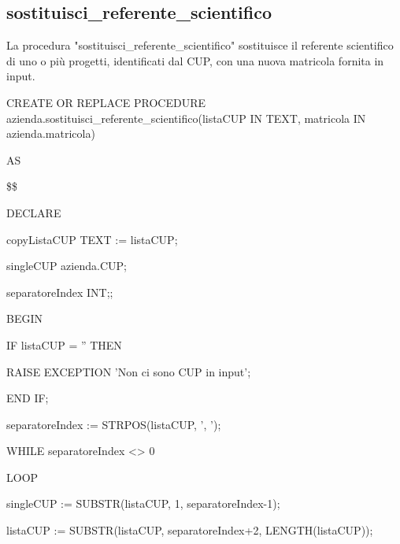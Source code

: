         \subsection{sostituisci\_referente\_scientifico}
        La procedura "sostituisci\_referente\_scientifico" sostituisce il referente scientifico di uno o più progetti, identificati dal CUP, con una nuova matricola fornita in input.
        \ttfamily
            \begin{flushleft}
                \begin{description}
                    \item CREATE OR REPLACE PROCEDURE azienda.sostituisci\_referente\_scientifico(listaCUP IN TEXT, matricola IN azienda.matricola)   
                    \item AS
                    \item \$\$
                    \item DECLARE
                    \begin{description}
                        \item copyListaCUP TEXT := listaCUP;
                        \item singleCUP azienda.CUP;
                        \item separatoreIndex INT;;
                    \end{description}
                    \item BEGIN 
                    \begin{description}
                        \item IF listaCUP = '' THEN
                        \begin{description}
                            \item RAISE EXCEPTION 'Non ci sono CUP in input';
                        \end{description}
                        \item END IF;
                        \item separatoreIndex := STRPOS(listaCUP, ', ');
                        
                        \vspace{0.5cm}

                        \item WHILE separatoreIndex <> 0
                        \item LOOP
                        \begin{description}
                            \item singleCUP := SUBSTR(listaCUP, 1, separatoreIndex-1);
                            \item listaCUP := SUBSTR(listaCUP, separatoreIndex+2, LENGTH(listaCUP));
                            

\end{description}
\end{description}
\end{description}
\end{flushleft}
